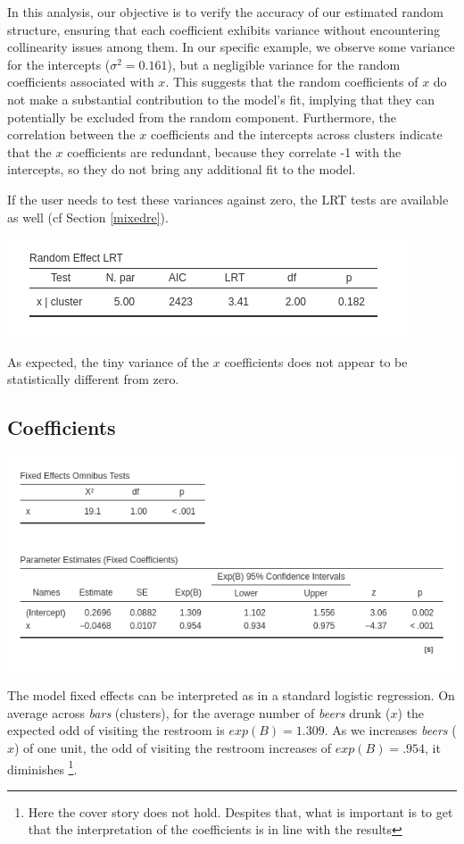 \documentclass[
]{book}
\begin{document}
In this analysis, our objective is to verify the accuracy of our estimated random structure, ensuring that each coefficient exhibits variance without encountering collinearity issues among them. In our specific example, we observe some variance for the intercepts (\(\sigma^2 = 0.161\)), but a negligible variance for the random coefficients associated with \(x\). This suggests that the random coefficients of \(x\) do not make a substantial contribution to the model's fit, implying that they can potentially be excluded from the random component. Furthermore, the correlation between the \(x\) coefficients and the intercepts across clusters indicate that the \(x\) coefficients are redundant, because they correlate -1 with the intercepts, so they do not bring any additional fit to the model.

If the user needs to test these variances against zero, the LRT tests are available as well (cf Section \ref{mixedre}).

\includegraphics[width=0.7\linewidth]{bookletpics/5_logistic_output5}

As expected, the tiny variance of the \(x\) coefficients does not appear to be statistically different from zero.

\hypertarget{coefficients-4}{%
\subsection{Coefficients}\label{coefficients-4}}

\includegraphics[width=0.8\linewidth]{bookletpics/5_logistic_output4}

The model fixed effects can be interpreted as in a standard logistic regression. On average across \emph{bars} (clusters), for the average number of \emph{beers} drunk (\(x\)) the expected odd of visiting the restroom is \(exp(B)=1.309\). As we increases \emph{beers} (\(x\)) of one unit, the odd of visiting the restroom increases of \(exp(B)=.954\), it diminishes \footnote{Here the cover story does not hold. Despites that, what is important is to get that the interpretation of the coefficients is in line with the results}.
\end{document}

